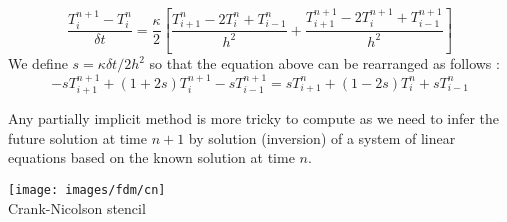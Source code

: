 \[
\frac{T_{i}^{n+1}-T_i^n}{\delta t} 
= \frac{\kappa}{2} \left[
\frac{T_{i+1}^{n} - 2T_i^{n} + T_{i-1}^{n}}{h^2}
+
\frac{T_{i+1}^{n+1} - 2T_i^{n+1} + T_{i-1}^{n+1}}{h^2}
\right]
\]
We define $s=\kappa \delta t/ 2h^2$ so that the equation above can be rearranged as follows :
\[
-s T_{i+1}^{n+1} + (1+2s) T_{i}^{n+1} - s T_{i-1}^{n+1} = 
s T_{i+1}^{n} + (1-2s) T_{i}^{n} + s T_{i-1}^{n} 
\]


Any partially implicit method is more tricky to compute as we need to infer the future solution 
at time $n+1$ by solution (inversion) of a system of linear equations based on the known solution at time $n$. 

\begin{center}
\texttt{[image: images/fdm/cn]}\\
Crank-Nicolson stencil
\end{center}









